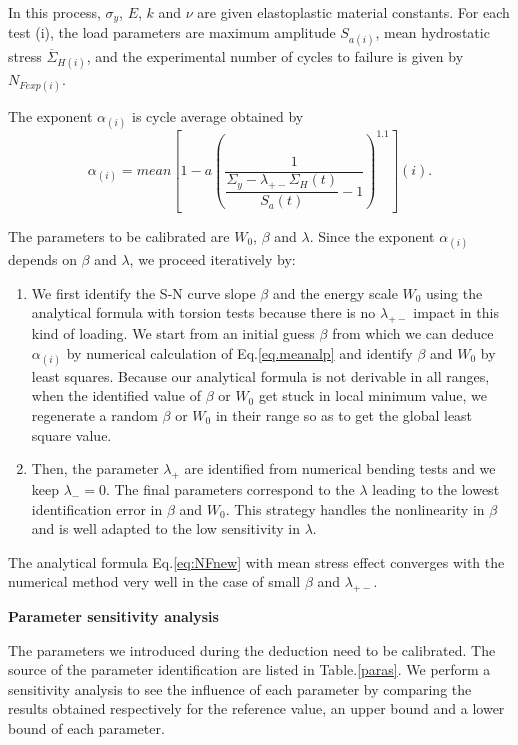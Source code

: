 In this process, $\sigma_y$, $E$, $k$ and $\nu$ are given elastoplastic material constants. For each test (i), the load parameters are maximum amplitude $S_{a(i)}$, mean hydrostatic stress $\overline{\Sigma}_{H(i)}$, and the experimental number of cycles to failure is given by $N_{Fexp(i)}$.

The exponent $\alpha_{(i)}$ is cycle average obtained by
\begin{equation}
\alpha_{(i)}=mean\left[1-a\left( \dfrac{1}{\dfrac{\Sigma_y-\lambda_{+-} \Sigma_{H}(t)}{S_{a}(t)}-1 } \right)^{1.1}\right] (i).
\label{eq.meanalp}
\end{equation}

The parameters to be calibrated are $W_0$, $\beta$ and $\lambda$. Since the exponent $\alpha_{(i)}$ depends on $\beta$ and $\lambda$, we proceed iteratively by:

\begin{enumerate}
	\item We first identify the S-N curve slope $\beta$ and the energy scale $W_0$ using the analytical formula with torsion tests because there is no $\lambda_{+-}$ impact in this kind of loading. We start from an initial guess $\beta$ from which we can deduce $\alpha_{(i)}$ by  numerical calculation of Eq.\ref{eq.meanalp} and identify $\beta$ and $W_0$ by least squares. Because our analytical formula is not derivable in all ranges, when the identified value of $\beta$ or $W_0$ get stuck in local minimum value, we regenerate a random $\beta$ or $W_0$ in their range so as to get the global least square value.
	\item Then, the parameter $\lambda_{+}$ are identified from numerical bending tests and we keep $\lambda_-=0$. The final parameters correspond to the $\lambda$ leading to the lowest identification error in $\beta$ and $W_0$. This strategy handles the nonlinearity in $\beta$ and is well adapted to the low sensitivity in $\lambda$.
\end{enumerate}



The analytical formula Eq.\eqref{eq:NFnew} with mean stress effect converges with the numerical method very well in the case of small $\beta$ and $\lambda_{+-}$. 


\textbf{Parameter sensitivity analysis}

The parameters we introduced during the deduction need to be calibrated. The source of the parameter identification are listed in Table.\ref{paras}.
We perform a sensitivity analysis to see the influence of each parameter by comparing the results obtained respectively for the reference value, an upper bound and a lower bound of each parameter.

